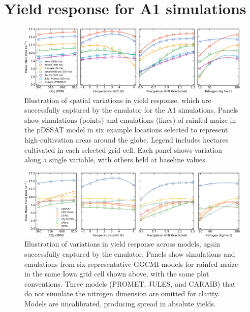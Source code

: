 \documentclass[10pt]{article}
\begin{document}
{{%
\clearpage
\section{Yield response for A1 simulations}
\begin{figure}[h!]
\centering
    \includegraphics[width=16.3cm]{regression_exampleA1.png}
    \caption{
    Illustration of spatial variations in yield response, which are successfully captured by the emulator for the A1 simulations. 
    Panels show simulations (points) and emulations (lines) of rainfed maize in the pDSSAT model in six example locations selected to represent high-cultivation areas around the globe. 
    Legend includes hectares cultivated in each selected grid cell. 
    Each panel shows variation along a single variable, with others held at baseline values. 
    }
   \label{fig:regression}
\end{figure}

\begin{figure}[h!]
\centering
    \includegraphics[width=16.3cm]{regression_exampleA1_2.png}
    \caption{
    Illustration of variations in yield response across models, again successfully captured by the emulator. 
    Panels show simulations and emulations from six representative GGCMI models for rainfed maize in the same Iowa grid cell shown above, with the same plot conventions. 
    Three models (PROMET, JULES, and CARAIB) that do not simulate the nitrogen dimension are omitted for clarity. 
    Models are uncalibrated, producing spread in absolute yields. 
    }
   \label{fig:regression_2}
\end{figure}

}}
\end{document}

